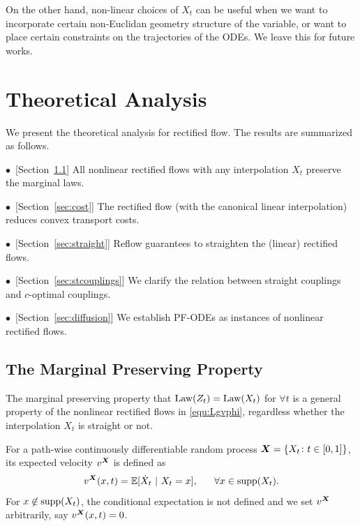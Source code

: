 On the other hand, non-linear choices of $X_t$ can be useful %
when we want to incorporate certain non-Euclidan geometry structure of the variable, 
or want to place certain constraints on the  trajectories of the ODEs.  
We leave this for future works. 
 













 




 
 


\section{Theoretical Analysis} 
\label{sec:theory}
We present the theoretical analysis for rectified flow. The results are summarized as follows. 


$\bullet$~[Section~\ref{sec:marginal}] %
All nonlinear rectified flows with any interpolation $X_t$ preserve the marginal laws.  

$\bullet$~[Section~\ref{sec:cost}] The rectified flow (with the canonical linear interpolation) reduces convex transport costs.  %

$\bullet$~[Section~\ref{sec:straight}] %
Reflow guarantees to straighten the (linear) rectified flows. 

$\bullet$~[Section~\ref{sec:stcouplings}] %
We clarify the relation between 
straight couplings and $c$-optimal couplings. 

$\bullet$~[Section~\ref{sec:diffusion}] We %
establish  PF-ODEs as instances of nonlinear rectified flows. 











 




 
 


\subsection{The Marginal Preserving Property}
\label{sec:marginal} 
The marginal preserving property that $\mathrm{Law}(Z_t)=\mathrm{Law}(X_t)$ for $\forall t$ is a general property of the nonlinear rectified flows in  \eqref{equ:Lgvphi},
regardless whether the interpolation $X_t$ is straight or not. 
\begin{mydef}
For a path-wise continuously differentiable random process  ${{\boldsymbol{X}}} = \{X_t\colon t\in[0,1]\}$, its expected velocity $v^{{\boldsymbol{X}}}$ is defined as 
$$v^{{\boldsymbol{X}}}(x, t) = 
\mathbb{E}[\dot X_t ~|~ X_t = x],~~~~~ \forall x\in \mathrm{supp}(X_t).
$$
For $x\not\in \mathrm{supp}(X_t)$, the conditional expectation is not defined and we set 
$v^{{\boldsymbol{X}}}$ arbitrarily, say $v^{{\boldsymbol{X}}}(x,t) = 0$. 
\end{mydef}

